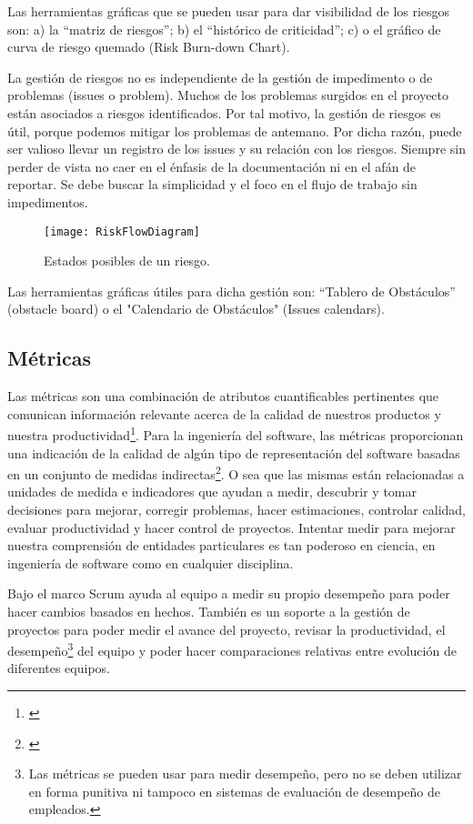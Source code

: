 Las herramientas gráficas que se pueden usar para dar visibilidad de los riesgos son: a) la “matriz de riesgos”; b) el “histórico de criticidad”; c) o el gráfico de curva de riesgo quemado (Risk Burn-down Chart).

La gestión de riesgos no es independiente de la gestión de impedimento o de problemas (issues o problem). Muchos de los problemas surgidos en el proyecto están asociados a riesgos identificados. Por tal motivo, la gestión de riesgos es útil, porque podemos mitigar los problemas de antemano. Por dicha razón, puede ser valioso llevar un registro de los issues y su relación con los riesgos. Siempre sin perder de vista no caer en el énfasis de la documentación ni en el afán de reportar. Se debe buscar la simplicidad y el foco en el flujo de trabajo sin impedimentos.

\begin{figure}[h]
  \centering
  \texttt{[image: RiskFlowDiagram]}
  \caption{Estados posibles de un riesgo.}
  \centering
  \label{fig:RiskFlowDiagram} %
\end{figure}
Las herramientas gráficas útiles para dicha gestión son: “Tablero de Obstáculos” (obstacle board) o el "Calendario de Obstáculos" (Issues calendars).


\subsection{Métricas}

Las métricas son una combinación de atributos cuantificables pertinentes que comunican información relevante acerca de la calidad de nuestros productos y nuestra productividad\footnote{\cite{INCOSE-2005}}. Para la ingeniería del software, las métricas proporcionan una indicación de la calidad de algún tipo de representación del software basadas en un conjunto de medidas indirectas\footnote{\cite{Roger-Pressman-2002}}. O sea que las mismas están relacionadas a unidades de medida e indicadores que ayudan a medir, descubrir y tomar decisiones para mejorar, corregir problemas, hacer estimaciones, controlar calidad, evaluar productividad y hacer control de proyectos. Intentar medir para mejorar nuestra comprensión de entidades particulares es tan poderoso en ciencia, en ingeniería de software como en cualquier disciplina.

Bajo el marco Scrum ayuda al equipo a medir su propio desempeño para poder hacer cambios basados en hechos. También es un soporte a la gestión de proyectos para poder medir el avance del proyecto, revisar la productividad, el desempeño\footnote{Las métricas se pueden usar para medir desempeño, pero no se deben utilizar en forma punitiva ni tampoco en sistemas de evaluación de desempeño de empleados.} del equipo y poder hacer comparaciones relativas entre evolución de diferentes equipos. 

